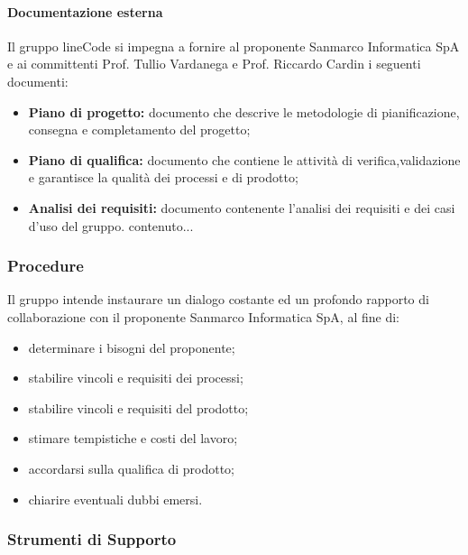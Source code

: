 \documentclass[]{article}
\begin{document}
							
						\paragraph{Documentazione esterna}
						 Il gruppo lineCode si impegna a fornire al proponente Sanmarco Informatica SpA e ai committenti Prof. Tullio Vardanega e Prof. Riccardo Cardin i seguenti documenti:
						 \begin{itemize}
						 	\item \textbf{Piano di progetto:} documento che descrive le metodologie di pianificazione, consegna e completamento del progetto;
						 	\item \textbf{Piano di qualifica:} documento che contiene le attività di verifica,validazione e garantisce la qualità dei processi e di prodotto;
						 	\item \textbf{Analisi dei requisiti:} documento contenente l'analisi dei requisiti e dei casi d'uso del gruppo.
						 	contenuto...
						 \end{itemize}
					
					\subsubsection{Procedure}
						Il gruppo intende instaurare un dialogo costante ed un profondo rapporto di collaborazione con il proponente Sanmarco Informatica SpA, al fine di:
						\begin{itemize}
							\item determinare i bisogni del proponente;
							\item stabilire vincoli e  requisiti dei processi;
							\item stabilire vincoli e requisiti del prodotto;
							\item stimare tempistiche e costi del lavoro;
							\item accordarsi sulla qualifica di prodotto;
							\item chiarire eventuali dubbi emersi.
							
						\end{itemize}
						
						
					
					\subsubsection{Strumenti di Supporto}
			
		
\end{document}
